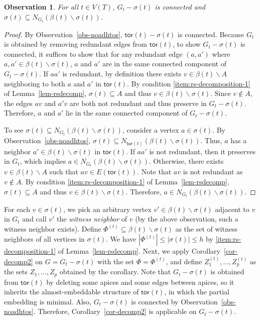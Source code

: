 \documentclass[a4paper,11pt]{article}
\numberwithin{lemma}{section}
\newtheorem{observation}[lemma]{Observation}
\newcommand{\tor}{\mathsf{tor}}
\begin{document}
\begin{observation} \label{obs-noadhGt}
For all $t \in V(T)$, $G_t - \sigma(t)$ is connected and $\sigma(t) \subseteq N_{G_t}(\beta(t) \backslash \sigma(t))$.
\end{observation}
\begin{proof}
By Observation~\ref{obs-noadhtos}, $\tor(t) - \sigma(t)$ is connected.
Because $G_t$ is obtained by removing redundant edges from $\tor(t)$, to show $G_t - \sigma(t)$ is connected, it suffices to show that for any redundant edge $(a,a')$ where $a,a' \in \beta(t) \backslash \sigma(t)$, $a$ and $a'$ are in the same connected component of $G_t - \sigma(t)$.
If $aa'$ is redundant, by definition there exists $v \in \beta(t) \backslash A$ neighboring to both $a$ and $a'$ in $\tor(t)$.
By condition \ref{item:rs-decomposition-1} of Lemma~\ref{lem-rsdecomp}, $\sigma(t) \subseteq A$ and thus $v \in \beta(t) \backslash \sigma(t)$.
Since $v \notin A$, the edges $av$ and $a'v$ are both not redundant and thus preserve in $G_t - \sigma(t)$.
Therefore, $a$ and $a'$ lie in the same connected component of $G_t - \sigma(t)$.

To see $\sigma(t) \subseteq N_{G_t}(\beta(t) \backslash \sigma(t))$, consider a vertex $a \in \sigma(t)$.
By Observation~\ref{obs-noadhtos}, $\sigma(t) \subseteq N_{\tor(t)}(\beta(t) \backslash \sigma(t))$.
Thus, $a$ has a neighbor $a' \in \beta(t) \backslash \sigma(t)$ in $\tor(t)$.
If $aa'$ is not redundant, then it preserves in $G_t$, which implies $a \in N_{G_t}(\beta(t) \backslash \sigma(t))$.
Otherwise, there exists $v \in \beta(t) \backslash A$ such that $av \in E(\tor(t))$.
Note that $av$ is not redundant as $v \notin A$.
By condition \ref{item:rs-decomposition-1} of Lemma~\ref{lem-rsdecomp}, $\sigma(t) \subseteq A$ and thus $v \in \beta(t) \backslash \sigma(t)$.
Therefore, $a \in N_{G_t}(\beta(t) \backslash \sigma(t))$.
\end{proof}

For each $v \in \sigma(t)$, we pick an arbitrary vertex $v' \in \beta(t) \backslash \sigma(t)$ adjacent to $v$ in $G_t$ and call $v'$ the \textit{witness neighbor} of $v$ (by the above observation, such a witness neighbor exists).
Define $\varPhi^{(t)} \subseteq \beta(t) \backslash \sigma(t)$ as the set of witness neighbors of all vertices in $\sigma(t)$.
We have $|\varPhi^{(t)}| \leq |\sigma(t)| \leq h$ by \ref{item:rs-decomposition-1} of Lemma~\ref{lem-rsdecomp}.
Next, we apply Corollary~\ref{cor-decomp2} on $G = G_t - \sigma(t)$ with the set $\varPhi = \varPhi^{(t)}$, and define $Z_1^{(t)},\dots,Z_p^{(t)}$ as the sets $Z_1,\dots,Z_p$ obtained by the corollary.
Note that $G_t - \sigma(t)$ is obtained from $\tor(t)$ by deleting some apices and some edges between apices, so it inherits the almost-embeddable structure of $\tor(t)$, in which the partial embedding is minimal.
Also, $G_t - \sigma(t)$ is connected by Observation~\ref{obs-noadhtos}.
Therefore, Corollary~\ref{cor-decomp2} is applicable on $G_t - \sigma(t)$.
\end{document}
